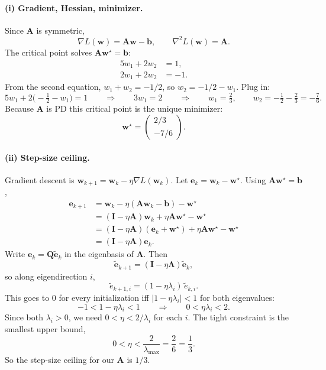 \documentclass[11pt]{article}
\newcommand{\vct}[1]{\mathbf{#1}}
\newcommand{\mat}[1]{\mathbf{#1}}
\begin{document}
\paragraph{(i) Gradient, Hessian, minimizer.}
Since \(\mat{A}\) is symmetric,
\[
\nabla L(\vct{w}) = \mat{A}\vct{w} - \vct{b},
\qquad
\nabla^2 L(\vct{w}) = \mat{A}.
\]
The critical point solves \(\mat{A}\vct{w}^\star = \vct{b}\):
\begin{align*}
5w_1 + 2w_2 &= 1, \\
2w_1 + 2w_2 &= -1.
\end{align*}
From the second equation, \(w_1+w_2=-1/2\), so \(w_2=-1/2-w_1\). Plug in:
\[
5w_1 + 2\bigl(-\tfrac12-w_1\bigr)=1
\qquad\Rightarrow\qquad
3w_1=2
\qquad\Rightarrow\qquad
w_1=\tfrac23,
\qquad
w_2=-\tfrac12-\tfrac23=-\tfrac76.
\]
Because \(\mat{A}\) is PD this critical point is the unique minimizer:
\[
\vct{w}^\star
=
\begin{pmatrix} 2/3 \\ -7/6 \end{pmatrix}.
\]

\paragraph{(ii) Step-size ceiling.}
Gradient descent is \(\vct{w}_{k+1}=\vct{w}_k-\eta\nabla L(\vct{w}_k)\).
Let \(\vct{e}_k=\vct{w}_k-\vct{w}^\star\). Using
\(\mat{A}\vct{w}^\star=\vct{b}\),
\begin{align*}
\vct{e}_{k+1}
&= \vct{w}_k - \eta(\mat{A}\vct{w}_k-\vct{b}) - \vct{w}^\star \\
&= (\mat{I}-\eta\mat{A})\vct{w}_k + \eta\mat{A}\vct{w}^\star - \vct{w}^\star \\
&= (\mat{I}-\eta\mat{A})(\vct{e}_k+\vct{w}^\star)
   + \eta\mat{A}\vct{w}^\star - \vct{w}^\star \\
&= (\mat{I}-\eta\mat{A})\vct{e}_k.
\end{align*}
Write \(\vct{e}_k=\mat{Q}\tilde{\vct{e}}_k\) in the eigenbasis of
\(\mat{A}\). Then
\[
\tilde{\vct{e}}_{k+1}
= (\mat{I}-\eta\mat{\Lambda})\tilde{\vct{e}}_k,
\]
so along eigendirection \(i\),
\[
\tilde{e}_{k+1,i} = (1-\eta\lambda_i)\,\tilde{e}_{k,i}.
\]
This goes to \(0\) for every initialization iff \(|1-\eta\lambda_i|<1\) for
both eigenvalues:
\[
-1 < 1-\eta\lambda_i < 1
\qquad\Rightarrow\qquad
0 < \eta\lambda_i < 2.
\]
Since both \(\lambda_i>0\), we need \(0<\eta<2/\lambda_i\) for each \(i\).
The tight constraint is the smallest upper bound,
\[
0 < \eta < \frac{2}{\lambda_{\max}} = \frac{2}{6} = \frac13.
\]
So the step-size ceiling for our \(\mat{A}\) is \(1/3\).
\end{document}
